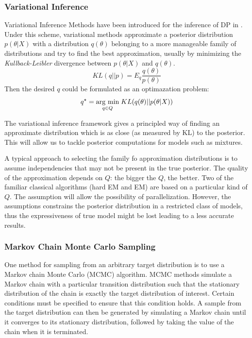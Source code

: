 	\subsubsection{Variational Inference}\label{vi}
	Variational Inference Methods have been introduced for the inference of DP in \cite{Blei2006}. Under this scheme, variational methods approximate a posterior distribution $p(\theta|X)$ with a distribution $q(\theta)$  belonging to a more manageable family of distributions and try to find the best approximation, usually by minimizing the \textit{Kullback-Leibler} divergence between $p(\theta|X)$ and $q(\theta)$. 
	\begin{equation}
		KL(q||p)=E_q\frac{q(\theta)}{p(\theta)}
	\end{equation}
	Then the desired $q$ could be formulated as an optimazation problem:
	\begin{equation}
		q^\star=\underset{q\in Q}{\operatorname{arg}\,\operatorname{min}}\; KL(q(\theta)||p(\theta|X))
	\end{equation}
	
	
	The variational inference framework gives a principled way of finding an approximate distribution which is as close (as measured by KL)
	to the posterior. This will allow us to tackle posterior computations for models such as mixtures.
	
	A typical approach to selecting the family fo approximation distributions is to assume independencies that may not be present in the true posterior. The quality of the approximation depends on $Q$: the bigger the $Q$, the better. Two of the familiar classical
	algorithms (hard EM and EM) are based on a particular kind of $Q$. The assumption will allow the possibility of parallelization. However, the assumptions constrains the posterior distribution in a restricted class of models, thus the expressiveness of true model might be lost leading to a less accurate results.
	\subsubsection{Markov Chain Monte Carlo Sampling}
	One method for sampling from an arbitrary target distribution is to use a Markov chain Monte Carlo (MCMC) algorithm. MCMC methods simulate a Markov chain with a particular transition distribution such that the stationary distribution of the chain is exactly the target distribution of interest. Certain conditions must be specified to ensure that this condition holds. A sample from the target distribution can then be generated by simulating a Markov chain until it converges to its stationary distribution, followed by taking the value of the chain when it is terminated. 
	
